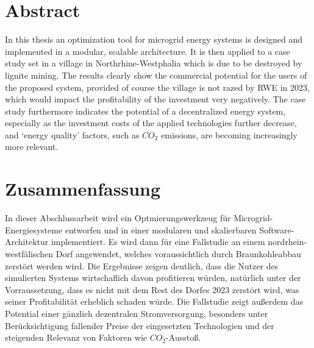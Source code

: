 \documentclass[
	11pt,								%
	DIV10,								%
	a4paper,         					%
	oneside,							%
	headheight=20pt,					%
	footheight=20pt,					%
    parskip=full,						%
    listof=totoc,						%
	bibliography=totoc,					%
	index=totoc,						%
]{scrartcl}
\begin{document}
	\newpage


	\section*{Abstract}
	
	In this thesis an optimization tool for microgrid energy systems is designed and implemented in a modular, scalable architecture. It is then applied to a case study set in a village in Northrhine-Westphalia which is due to be destroyed by lignite mining. The results clearly show the commercial potential for the users of the proposed system, provided of course the village is not razed by RWE in 2023, which would impact the profitability of the investment very negatively. The case study furthermore indicates the potential of a decentralized energy system, especially as the investment costs of the applied technologies further decrease, and `energy quality' factors, such as $CO_2$ emissions, are becoming increasingly more relevant.
	
	\section*{Zusammenfassung}
	
	In dieser Abschlussarbeit wird ein Optmierungswerkzeug für Microgrid-Energiesysteme entworfen und in einer modularen und skalierbaren Software-Architektur implementiert. Es wird dann für eine Fallstudie an einem nordrhein-westfälischen Dorf angewendet, welches voraussichtlich durch Braunkohleabbau zerstört werden wird. Die Ergebnisse zeigen deutlich, dass die Nutzer des simulierten Systems wirtschaflich davon profitieren würden, natürlich unter der Vorraussetzung, dass es nicht mit dem Rest des Dorfes 2023 zerstört wird, was seiner Profitabilität erheblich schaden würde. Die Fallstudie zeigt außerdem das Potential einer gänzlich dezentralen Stromversorgung, besonders unter Berücksichtigung fallender Preise der eingesetzten Technologien und der steigenden Relevanz von Faktoren wie $CO_2$-Ausstoß.
	
	
		\newpage	

	
\end{document}
